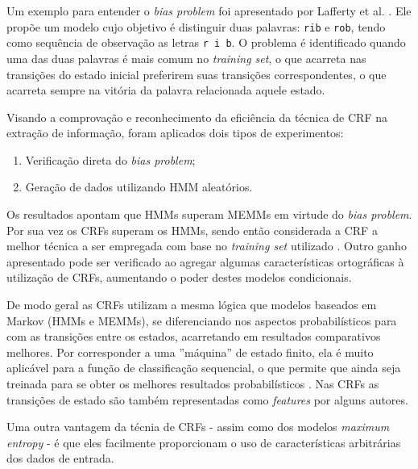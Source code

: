 \begin{textnew}
Um exemplo para entender o \textit{bias problem} foi apresentado por Lafferty et al. \cite{Lafferty-CRF}. Ele propõe um modelo cujo objetivo é distinguir duas palavras: \texttt{rib} e \texttt{rob}, tendo como sequência de observação as letras \texttt{r i b}. O problema é identificado quando uma das duas palavras é mais comum no \textit{training set}, o que acarreta nas transições do estado inicial preferirem suas transições correspondentes, o que acarreta sempre na vitória da palavra relacionada aquele estado.

Visando a comprovação e reconhecimento da eficiência da técnica de CRF na extração de informação, foram aplicados dois tipos de experimentos:

\begin{enumerate}
    \item Verificação direta do \textit{bias problem};
    \item Geração de dados utilizando HMM aleatórios.
\end{enumerate}

Os resultados apontam que HMMs superam MEMMs em virtude do \textit{bias problem}. Por sua vez os CRFs superam os HMMs, sendo então considerada a CRF a melhor técnica a ser empregada com base no \textit{training set} utilizado \cite{Lafferty-CRF}. Outro ganho apresentado pode ser verificado ao agregar algumas características ortográficas à utilização de CRFs, aumentando o poder destes modelos condicionais.

De modo geral as CRFs utilizam a mesma lógica que modelos baseados em Markov (HMMs e MEMMs), se diferenciando nos aspectos probabilísticos para com as transições entre os estados, acarretando em resultados comparativos melhores. Por corresponder a uma ''máquina'' de estado finito, ela é muito aplicável para a função de classificação sequencial, o que permite que ainda seja treinada para se obter os melhores resultados probabilísticos \cite{Peng-CRF-IE}. Nas CRFs as transições de estado são também representadas como \emph{features} por alguns autores.

\end{textnew}


Uma outra vantagem da técnia de CRFs - assim como dos modelos \emph{maximum entropy} - é que eles facilmente proporcionam o uso de características arbitrárias dos dados de entrada.

